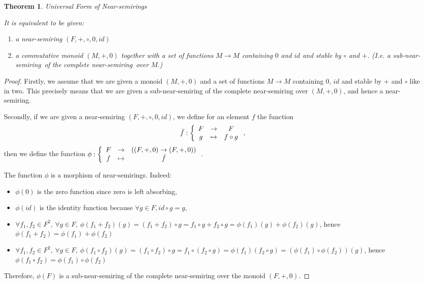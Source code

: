 \documentclass[11pt,a4paper]{article}
\newcommand{\Ns}{near-semiring}
\newcommand{\sns}{sub-near-semiring}
\newtheorem{theorem}{Theorem}
\begin{document}
\begin{theorem}{Universal Form of Near-semirings}

	It is equivalent to be given:

	\begin{enumerate}

		\item a near-semiring $(F,+,\circ,0,id)$

		\item a commutative monoid $(M,+,0)$ together with a set of functions $M \to M$ containing $0$ and $id$ and stable by $\circ$ and $+$. (I.e. a \sns\ of the complete \Ns\ over $M$.)

	\end{enumerate}

\end{theorem}

\begin{proof}

	Firstly, we assume that we are given a monoid $(M,+,0)$ and a set of functions $M \to M$ containing $0$, $id$ and stable by $+$ and $\circ$ like in two. This precisely means that we are given a sub-near-semiring of the complete near-semiring over $(M,+,0)$, and hence a near-semiring.
	
	Secondly, if we are given a near-semiring $(F,+,\circ,0,id)$, we define for an element $f$ the function 
	$$\bar{f} : \left\{ 
	\begin{array}{c c c}
		F & \to & F \\
		g & \mapsto & f \circ g
	\end{array} \right. ,$$
	then we define the function $\phi : \left\{ 
	\begin{array}{c c c}
		F & \to & ((F,+,0) \to (F,+,0)) \\
		f & \mapsto & \bar{f}
	\end{array} \right.$. 
	
	The function $\phi$ is a morphism of near-semirings. Indeed: 
	\begin{itemize}
	
		\item $\phi(0)$ is the zero function since zero is left absorbing,
		
		\item $\phi(id)$ is the identity function because $\forall g \in F,id \circ g= g$,
		
		\item $\forall f_1,f_2 \in F^2,\ \forall g \in F,\ \phi(f_1 + f_2)(g)=(f_1 + f_2) \circ g = f_1 \circ g + f_2 \circ g = \phi(f_1)(g) + \phi (f_2)(g)$, hence $\phi(f_1+f_2)=\phi(f_1)+\phi(f_2)$
		
		\item $\forall f_1,f_2 \in F^2,\ \forall g \in F,\ \phi(f_1 \circ f_2)(g)=(f_1 \circ f_2) \circ g = f_1 \circ (f_2 \circ g) = \phi(f_1)(f_2 \circ g) = (\phi(f_1) \circ \phi(f_2))(g) $, hence $\phi(f_1 \circ f_2)=\phi(f_1) \circ \phi(f_2)$
	
	\end{itemize}
	Therefore, $\phi(F)$ is a sub-near-semiring of the complete near-semiring over the monoid $(F,+,0)$.

\end{proof}
\end{document}
